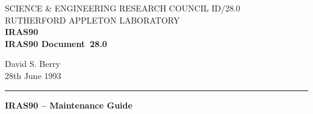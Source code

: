 \pagestyle{myheadings}

\newcommand{\stardoccategory}  {IRAS90 Document}
\newcommand{\stardocinitials}  {ID}
\newcommand{\stardocnumber}    {28.0}
\newcommand{\stardocauthors}   {David S. Berry}
\newcommand{\stardocdate}      {28th June 1993}
\newcommand{\stardoctitle}     {IRAS90 -- Maintenance Guide}

\newcommand{\stardocname}{\stardocinitials /\stardocnumber}
\renewcommand{\_}{{\tt\char'137}}     %
\markright{\stardocname}
\setlength{\textwidth}{160mm}
\setlength{\textheight}{230mm}
\setlength{\topmargin}{-2mm}
\setlength{\oddsidemargin}{0mm}
\setlength{\evensidemargin}{0mm}
\setlength{\parindent}{0mm}
\setlength{\parskip}{\medskipamount}
\setlength{\unitlength}{1mm}
\setlength{\unitlength}{1mm}


\newcommand{\dgs}{\hbox{$^\circ$}} 
\newcommand{\lsk}{\raisebox{-0.4ex}{\rm *}}
\newcommand{\menuitem}[2]
  {{\bf #1}: \addtolength{\baselineskip}{-0.4ex}
  \parbox[t]{128mm}{#2} \addtolength{\baselineskip}{0.4ex} \\ \hspace{-5pt}}
\newenvironment{refs}{\goodbreak
                      \vspace{3ex}
                      \begin{list}{}{\setlength{\topsep}{0mm}
                                     \setlength{\partopsep}{0mm}
                                     \setlength{\itemsep}{0mm}
                                     \setlength{\parsep}{0mm}
                                     \setlength{\leftmargin}{1.5em}
                                     \setlength{\itemindent}{-\leftmargin}
                                     \setlength{\labelsep}{0mm}
                                     \setlength{\labelwidth}{0mm}}
                    }{\end{list}}


\thispagestyle{empty}
SCIENCE \& ENGINEERING RESEARCH COUNCIL \hfill \stardocname\\
RUTHERFORD APPLETON LABORATORY\\
{\large\bf IRAS90\\}
{\large\bf \stardoccategory\ \stardocnumber}
\begin{flushright}
\stardocauthors\\
\stardocdate
\end{flushright}
\vspace{-4mm}
\rule{\textwidth}{0.5mm}
\vspace{5mm}
\begin{center}
{\Large\bf \stardoctitle}
\end{center}
\vspace{5mm}

